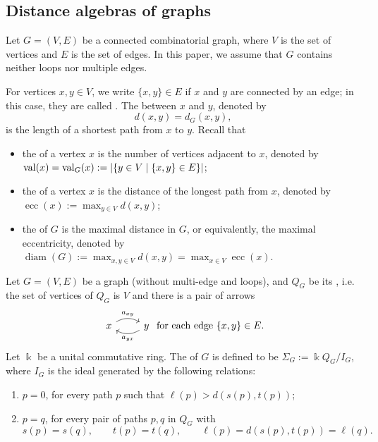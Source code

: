 \documentclass[a4paper,leqno]{amsart}
\begin{document}
\subsection{Distance algebras of graphs} 

Let $G=(V,E)$ be a connected combinatorial graph, where $V$ is the set of vertices and $E$ is the set of edges. In this paper, we assume that $G$ contains neither loops nor multiple edges.

For vertices $x,y\in V$, we write $\{x,y\}\in E$ if $x$ and $y$ are connected by an edge; in this case, they are called . The  between $x$ and $y$, denoted by $$d(x,y)=d_G(x,y),$$ is the length of a shortest path from $x$ to $y$. Recall that 
\begin{itemize}
    \item the  of a vertex $x$ is the number of vertices adjacent to $x$, denoted by $\operatorname{val}(x)=\operatorname{val}_G(x):=|\{y\in V\mid \{x,y\}\in E\}|$;

    \item the  of a vertex $x$ is the distance of the longest path from $x$, denoted by $\operatorname{ecc}(x):=\max_{y\in V} d(x,y)$;

    \item the  of $G$ is the maximal distance in $G$, or equivalently, the maximal eccentricity, denoted by $\operatorname{diam}(G) :=\max_{x,y\in V}d(x,y)=\max_{x\in V}\operatorname{ecc}(x)$.
\end{itemize}

\begin{dfn}\label{def:distance-algebra}
    Let $G=(V,E)$ be a graph (without multi-edge and loops), and $Q_G$ be its , i.e. the set of vertices of $Q_G$ is $V$ and there is a pair of arrows 
\[\begin{tikzcd}
	x \arrow[r, "{a_{xy}}", bend left] & y \arrow[l, "{a_{yx}}", bend left]
\end{tikzcd} \text{ for each edge }\{x,y\}\in E.\]
Let $\Bbbk$ be a unital commutative ring.
The  of $G$ is defined to be
$\Sigma_G:=\Bbbk Q_G/I_G$, where $I_G$ is the ideal generated by the following relations:
\begin{enumerate}
    \item $p=0$, for every path $p$ such that $\ell(p)>d(s(p),t(p))$;
    \item $p=q$, for every pair of paths $p,q$ in $Q_G$ with
$$s(p)=s(q),\qquad t(p)=t(q),\qquad
\ell(p)=d(s(p),t(p))=\ell(q).$$
\end{enumerate}
\end{dfn}
\end{document}
